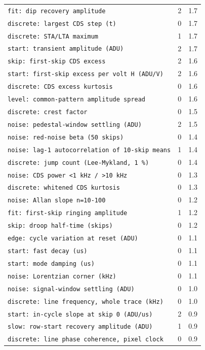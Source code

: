 \documentclass[10pt]{article}
\renewcommand{\_}{\oldunderscore\allowbreak}
\begin{document}
\begin{longtable}{>{\raggedright\arraybackslash}p{}rr}
\texttt{fit: dip recovery amplitude} & 2 & 1.7 \\
\texttt{discrete: largest CDS step (t)} & 0 & 1.7 \\
\texttt{discrete: STA/LTA maximum} & 1 & 1.7 \\
\texttt{start: transient amplitude (ADU)} & 2 & 1.7 \\
\texttt{skip: first-skip CDS excess} & 2 & 1.6 \\
\texttt{start: first-skip excess per volt H (ADU/V)} & 2 & 1.6 \\
\texttt{discrete: CDS excess kurtosis} & 0 & 1.6 \\
\texttt{level: common-pattern amplitude spread} & 0 & 1.6 \\
\texttt{discrete: crest factor} & 0 & 1.5 \\
\texttt{noise: pedestal-window settling (ADU)} & 2 & 1.5 \\
\texttt{noise: red-noise beta (50 skips)} & 0 & 1.4 \\
\texttt{noise: lag-1 autocorrelation of 10-skip means} & 1 & 1.4 \\
\texttt{discrete: jump count (Lee-Mykland, 1 \%)} & 0 & 1.4 \\
\texttt{noise: CDS power \textless{}1 kHz / \textgreater{}10 kHz} & 0 & 1.3 \\
\texttt{discrete: whitened CDS kurtosis} & 0 & 1.3 \\
\texttt{noise: Allan slope n=10-100} & 0 & 1.2 \\
\texttt{fit: first-skip ringing amplitude} & 1 & 1.2 \\
\texttt{skip: droop half-time (skips)} & 0 & 1.2 \\
\texttt{edge: cycle variation at reset (ADU)} & 0 & 1.1 \\
\texttt{start: fast decay (us)} & 0 & 1.1 \\
\texttt{start: mode damping (us)} & 0 & 1.1 \\
\texttt{noise: Lorentzian corner (kHz)} & 0 & 1.1 \\
\texttt{noise: signal-window settling (ADU)} & 0 & 1.0 \\
\texttt{discrete: line frequency, whole trace (kHz)} & 0 & 1.0 \\
\texttt{start: in-cycle slope at skip 0 (ADU/us)} & 2 & 0.9 \\
\texttt{slow: row-start recovery amplitude (ADU)} & 1 & 0.9 \\
\texttt{discrete: line phase coherence, pixel clock} & 0 & 0.9 \\

\end{longtable}
\end{document}
